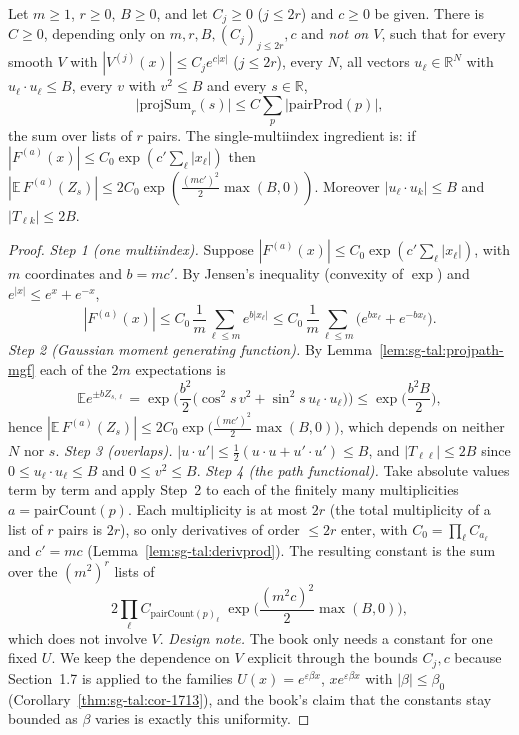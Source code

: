 \begin{lemma}
\label{lem:sg-tal:projpath-bound}
  \leanok
{}
Let $m\ge1$, $r\ge0$, $B\ge0$, and let $C_j\ge0$ ($j\le2r$) and $c\ge0$ be given.  There is $C\ge0$, depending only on $m,r,B,(C_j)_{j\le2r},c$ and \emph{not on $V$}, such that for every smooth $V$ with $|V^{(j)}(x)|\le C_je^{c|x|}$ ($j\le2r$), every $N$, all vectors $u_\ell\in\mathbb R^N$ with $u_\ell\cdot u_\ell\le B$, every $v$ with $v^2\le B$ and every $s\in\mathbb R$,
\[
\bigl|\mathrm{projSum}_r(s)\bigr|\le C\sum_{p}\bigl|\mathrm{pairProd}(p)\bigr|,
\]
the sum over lists of $r$ pairs.  The single-multiindex ingredient is: if $|F^{(a)}(x)|\le C_0\exp(c'\sum_\ell|x_\ell|)$ then $|\mathbb E\,F^{(a)}(Z_s)|\le2C_0\exp(\frac{(mc')^2}{2}\max(B,0))$.  Moreover $|u_\ell\cdot u_k|\le B$ and $|T_{\ell k}|\le2B$.
\end{lemma}
\begin{proof}
  \leanok
\emph{Step 1 (one multiindex).} Suppose $|F^{(a)}(x)|\le C_0\exp(c'\sum_\ell|x_\ell|)$, with $m$ coordinates and $b=mc'$. By Jensen's inequality (convexity of $\exp$) and $e^{|x|}\le e^{x}+e^{-x}$,
\[
|F^{(a)}(x)|\le C_0\,\frac1m\sum_{\ell\le m}e^{b|x_\ell|}\le C_0\,\frac1m\sum_{\ell\le m}\big(e^{bx_\ell}+e^{-bx_\ell}\big).
\]
\emph{Step 2 (Gaussian moment generating function).} By Lemma~\ref{lem:sg-tal:projpath-mgf} each of the $2m$ expectations is
\[
\mathbb Ee^{\pm bZ_{s,\ell}}=\exp\Big(\frac{b^2}2\big(\cos^2s\,v^2+\sin^2s\,u_\ell\cdot u_\ell\big)\Big)\le\exp\Big(\frac{b^2B}2\Big),
\]
hence $|\mathbb E\,F^{(a)}(Z_s)|\le2C_0\exp\big(\tfrac{(mc')^2}2\max(B,0)\big)$, which depends on neither $N$ nor $s$.
\emph{Step 3 (overlaps).} $|u\cdot u'|\le\frac12(u\cdot u+u'\cdot u')\le B$, and $|T_{\ell\ell}|\le2B$ since $0\le u_\ell\cdot u_\ell\le B$ and $0\le v^2\le B$.
\emph{Step 4 (the path functional).} Take absolute values term by term and apply Step~2 to each of the finitely many multiplicities $a=\mathrm{pairCount}(p)$. Each multiplicity is at most $2r$ (the total multiplicity of a list of $r$ pairs is $2r$), so only derivatives of order $\le2r$ enter, with $C_0=\prod_\ell C_{a_\ell}$ and $c'=mc$ (Lemma~\ref{lem:sg-tal:derivprod}). The resulting constant is the sum over the $(m^2)^r$ lists of
\[
2\prod_\ell C_{\mathrm{pairCount}(p)_\ell}\;\exp\Big(\frac{(m^2c)^2}2\max(B,0)\Big),
\]
which does not involve $V$.
\emph{Design note.}  The book only needs a constant for one fixed $U$.  We keep the dependence on $V$ explicit through the bounds $C_j,c$ because Section~1.7 is applied to the families $U(x)=e^{\varepsilon\beta x}$, $xe^{\varepsilon\beta x}$ with $|\beta|\le\beta_0$ (Corollary~\ref{thm:sg-tal:cor-1713}), and the book's claim that the constants stay bounded as $\beta$ varies is exactly this uniformity.
\end{proof}

